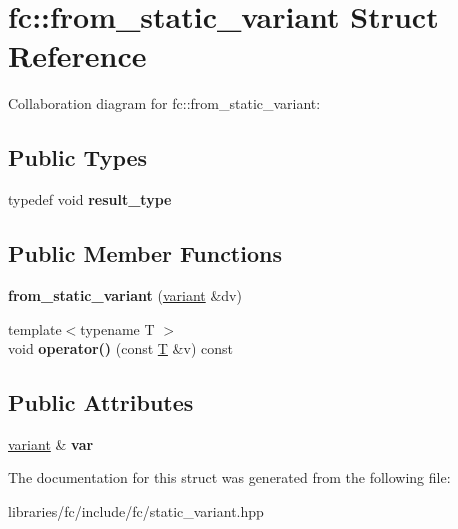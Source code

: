 \hypertarget{structfc_1_1from__static__variant}{}\section{fc\+:\+:from\+\_\+static\+\_\+variant Struct Reference}
\label{structfc_1_1from__static__variant}


Collaboration diagram for fc\+:\+:from\+\_\+static\+\_\+variant\+:
\subsection*{Public Types}
\begin{DoxyCompactItemize}
\item 
\mbox{\label{structfc_1_1from__static__variant_a08770618b1964ef79c910c2313ed446b}} 
typedef void {\bfseries result\+\_\+type}
\end{DoxyCompactItemize}
\subsection*{Public Member Functions}
\begin{DoxyCompactItemize}
\item 
\mbox{\label{structfc_1_1from__static__variant_a12294bd454b12bcc4510e313918360f1}} 
{\bfseries from\+\_\+static\+\_\+variant} (\mbox{\hyperlink{classfc_1_1variant}{variant}} \&dv)
\item 
\mbox{\label{structfc_1_1from__static__variant_a21c6151940ecd7dce7841d7d2cce5874}} 
{\footnotesize template$<$typename T $>$ }\\void {\bfseries operator()} (const \mbox{\hyperlink{struct_t}{T}} \&v) const
\end{DoxyCompactItemize}
\subsection*{Public Attributes}
\begin{DoxyCompactItemize}
\item 
\mbox{\label{structfc_1_1from__static__variant_a34dd5e7c8d969e29d1d1992ec1293230}} 
\mbox{\hyperlink{classfc_1_1variant}{variant}} \& {\bfseries var}
\end{DoxyCompactItemize}


The documentation for this struct was generated from the following file\+:\begin{DoxyCompactItemize}
\item 
libraries/fc/include/fc/static\+\_\+variant.\+hpp\end{DoxyCompactItemize}
